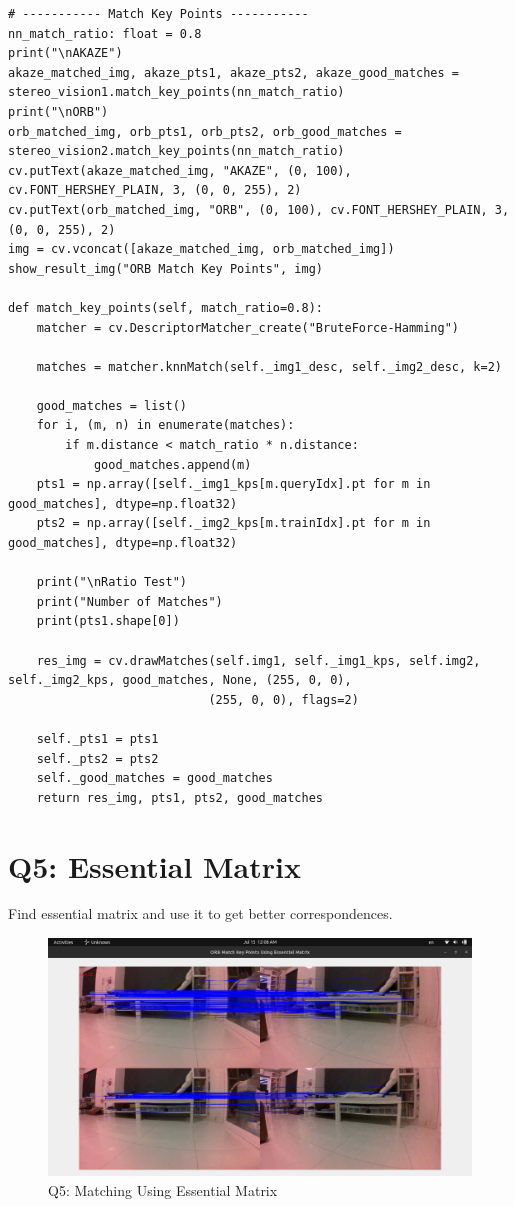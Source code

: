 \documentclass[a4paper, 12pt]{article}
\begin{document}
    \begin{lstlisting}
# ----------- Match Key Points -----------
nn_match_ratio: float = 0.8
print("\nAKAZE")
akaze_matched_img, akaze_pts1, akaze_pts2, akaze_good_matches = stereo_vision1.match_key_points(nn_match_ratio)
print("\nORB")
orb_matched_img, orb_pts1, orb_pts2, orb_good_matches = stereo_vision2.match_key_points(nn_match_ratio)
cv.putText(akaze_matched_img, "AKAZE", (0, 100), cv.FONT_HERSHEY_PLAIN, 3, (0, 0, 255), 2)
cv.putText(orb_matched_img, "ORB", (0, 100), cv.FONT_HERSHEY_PLAIN, 3, (0, 0, 255), 2)
img = cv.vconcat([akaze_matched_img, orb_matched_img])
show_result_img("ORB Match Key Points", img)

def match_key_points(self, match_ratio=0.8):
    matcher = cv.DescriptorMatcher_create("BruteForce-Hamming")

    matches = matcher.knnMatch(self._img1_desc, self._img2_desc, k=2)

    good_matches = list()
    for i, (m, n) in enumerate(matches):
        if m.distance < match_ratio * n.distance:
            good_matches.append(m)
    pts1 = np.array([self._img1_kps[m.queryIdx].pt for m in good_matches], dtype=np.float32)
    pts2 = np.array([self._img2_kps[m.trainIdx].pt for m in good_matches], dtype=np.float32)

    print("\nRatio Test")
    print("Number of Matches")
    print(pts1.shape[0])

    res_img = cv.drawMatches(self.img1, self._img1_kps, self.img2, self._img2_kps, good_matches, None, (255, 0, 0),
                            (255, 0, 0), flags=2)

    self._pts1 = pts1
    self._pts2 = pts2
    self._good_matches = good_matches
    return res_img, pts1, pts2, good_matches
    \end{lstlisting}

    \section{Q5: Essential Matrix}
    Find essential matrix and use it to get better correspondences.

    \begin{figure}
		\caption{Q5: Matching Using Essential Matrix}
		\includegraphics[scale=0.25]{img/essential_matrix.png}
	\end{figure}
    
\end{document}
